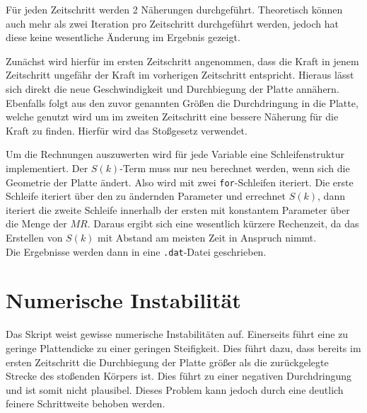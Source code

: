 Für jeden Zeitschritt werden 2 Näherungen durchgeführt. Theoretisch können auch mehr als zwei Iteration pro Zeitschritt durchgeführt werden, jedoch hat diese keine wesentliche Änderung im Ergebnis gezeigt.

Zunächst wird hierfür im ersten Zeitschritt angenommen, dass die Kraft in jenem Zeitschritt ungefähr der Kraft im vorherigen Zeitschritt entspricht. Hieraus lässt sich direkt die neue Geschwindigkeit und Durchbiegung der Platte annähern. Ebenfalls folgt aus den zuvor genannten Größen die Durchdringung in die Platte, welche genutzt wird um im zweiten Zeitschritt eine bessere Näherung für die Kraft zu finden. Hierfür wird das Stoßgesetz verwendet.

Um die Rechnungen auszuwerten wird für jede Variable eine Schleifenstruktur implementiert. Der $S(k)$-Term muss nur neu berechnet werden, wenn sich die Geometrie der Platte ändert. Also wird mit zwei \texttt{for}-Schleifen iteriert. Die erste Schleife iteriert über den zu ändernden Parameter und errechnet $S(k)$, dann iteriert die zweite Schleife innerhalb der ersten mit konstantem Parameter über die Menge der $MR$.  Daraus ergibt sich eine wesentlich kürzere Rechenzeit, da das Erstellen von $S(k)$ mit Abstand am meisten Zeit in Anspruch nimmt. \\
Die Ergebnisse werden dann in eine \texttt{.dat}-Datei geschrieben. 


\section*{Numerische Instabilität}

Das Skript weist gewisse numerische Instabilitäten auf. Einerseits führt eine zu geringe Plattendicke zu einer geringen Steifigkeit. Dies führt dazu, dass bereits im ersten Zeitschritt die Durchbiegung der Platte größer als die zurückgelegte Strecke des stoßenden Körpers ist. Dies führt zu einer negativen Durchdringung und ist somit nicht plausibel. Dieses Problem kann jedoch durch eine deutlich feinere Schrittweite behoben werden.






